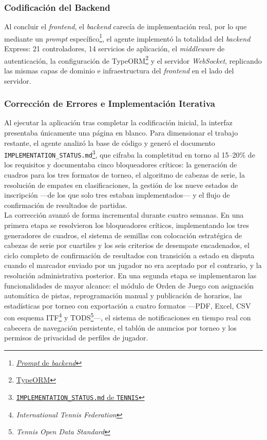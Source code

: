 \subsubsection{Codificación del Backend}

Al concluir el \textit{frontend}, el \textit{backend} carecía de implementación real, por lo que mediante un \textit{prompt} específico\footnote{\href{https://github.com/alu0101549491/TFG-Fabian-Gonzalez-Lence/blob/main/resources/prompts/5-TennisTournamentManager/3-Codificacion/backend.prompt.md}{\textit{Prompt} de \textit{backend}}}, el agente implementó la totalidad del \textit{backend} Express: 21 controladores, 14 servicios de aplicación, el \textit{middleware} de autenticación, la configuración de TypeORM\footnote{\href{https://typeorm.io/}{TypeORM}} y el servidor \textit{WebSocket}, replicando las mismas capas de dominio e infraestructura del \textit{frontend} en el lado del servidor.

\subsubsection{Corrección de Errores e Implementación Iterativa}

Al ejecutar la aplicación tras completar la codificación inicial, la interfaz presentaba únicamente una página en blanco. Para dimensionar el trabajo restante, el agente analizó la base de código y generó el documento \texttt{IMPLEMENTATION\_STATUS.md}\footnote{\href{https://github.com/alu0101549491/TFG-Fabian-Gonzalez-Lence/blob/main/projects/5-TennisTournamentManager/docs/IMPLEMENTATION_STATUS.md}{\texttt{IMPLEMENTATION\_STATUS.md} de \texttt{TENNIS}}}, que cifraba la completitud en torno al 15--20\% de los requisitos y documentaba cinco bloqueadores críticos: la generación de cuadros para los tres formatos de torneo, el algoritmo de cabezas de serie, la resolución de empates en clasificaciones, la gestión de los nueve estados de inscripción ---de los que solo tres estaban implementados--- y el flujo de confirmación de resultados de partidas.\\

La corrección avanzó de forma incremental durante cuatro semanas. En una primera etapa se resolvieron los bloqueadores críticos, implementando los tres generadores de cuadros, el sistema de semillas con colocación estratégica de cabezas de serie por cuartiles y los seis criterios de desempate encadenados, el ciclo completo de confirmación de resultados con transición a estado en disputa cuando el marcador enviado por un jugador no era aceptado por el contrario, y la resolución administrativa posterior. En una segunda etapa se implementaron las funcionalidades de mayor alcance: el módulo de Orden de Juego con asignación automática de pistas, reprogramación manual y publicación de horarios, las estadísticas por torneo con exportación a cuatro formatos ---PDF, Excel, CSV con esquema ITF\footnote{\textit{International Tennis Federation}} y TODS\footnote{\textit{Tennis Open Data Standard}}---, el sistema de notificaciones en tiempo real con cabecera de navegación persistente, el tablón de anuncios por torneo y los permisos de privacidad de perfiles de jugador.\\

